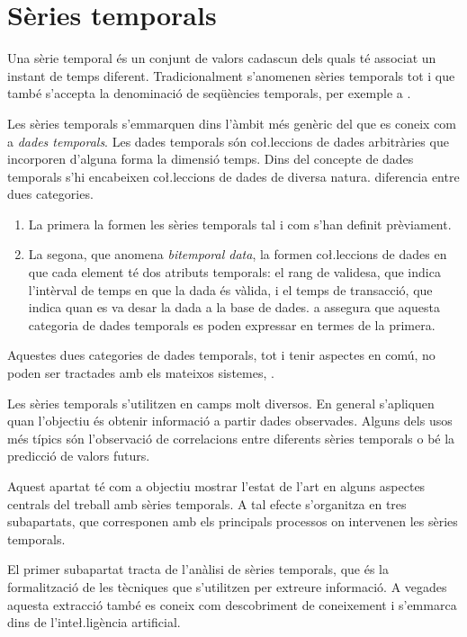 \section{Sèries temporals}

Una sèrie temporal és un conjunt de valors cadascun dels quals té
associat un instant de temps diferent.  Tradicionalment s'anomenen
sèries temporals tot i que també s'accepta la denominació de
seqüències temporals, per exemple a \cite{last:hetland}.

Les sèries temporals s'emmarquen dins l'àmbit més genèric del que es
coneix com a \emph{dades temporals}. Les dades temporals són
co\l.leccions de dades arbitràries que incorporen d'alguna forma la
dimensió temps.  Dins del concepte de dades temporals s'hi encabeixen
co\l.leccions de dades de diversa natura. \textcite{assfalg08:thesis}
diferencia entre dues categories.
\begin{enumerate}
\item La primera la formen les sèries temporals tal i com s'han
  definit prèviament. 
\item La segona, que anomena \emph{bitemporal data}, la formen
  co\l.leccions de dades en que cada element té dos atributs
  temporals: el rang de validesa, que indica l'intèrval de temps en
  que la dada és vàlida, i el temps de transacció, que indica quan es
  va desar la dada a la base de dades.  \citeauthor{assfalg08:thesis}
  a \cite{assfalg08:thesis} assegura que aquesta categoria de dades
  temporals es poden expressar en termes de la primera.
\end{enumerate}
Aquestes dues categories de dades temporals, tot i tenir aspectes en
comú, no poden ser tractades amb els mateixos
sistemes, \parencite{schmidt95}.

Les sèries temporals s'utilitzen en camps molt diversos. En general
s'apliquen quan l'objectiu és obtenir informació a partir dades
observades. Alguns dels usos més típics són l'observació de
correlacions entre diferents sèries temporals o bé la predicció de
valors futurs.

Aquest apartat té com a objectiu mostrar l'estat de l'art en alguns
aspectes centrals del treball amb sèries temporals. A tal efecte
s'organitza en tres subapartats, que corresponen amb els principals
processos on intervenen les sèries temporals.
 
El primer subapartat tracta de l'anàlisi de sèries temporals, que és
la formalització de les tècniques que s'utilitzen per extreure
informació. A vegades aquesta extracció també es coneix com
descobriment de coneixement i s'emmarca dins de l'inte\l.ligència
artificial.

